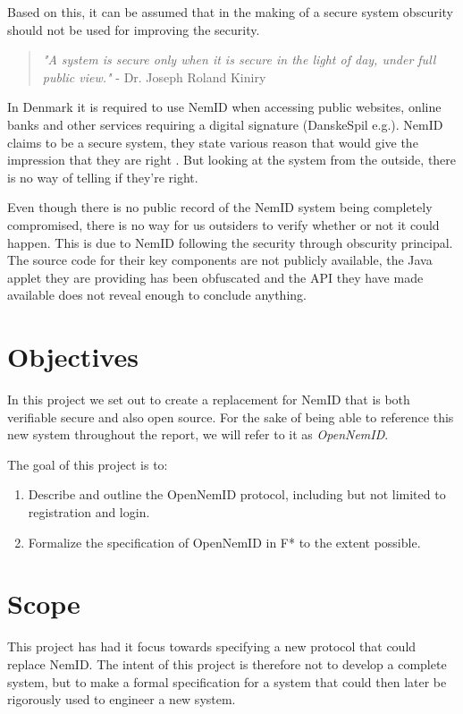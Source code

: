 \documentclass[twosided]{report}
\begin{document}
Based on this, it can be assumed that in the making of a secure system obscurity should not be used for improving the security.
\begin{quote}
\textit{"A system is secure only when it is secure in the light of day, under full public view."} - Dr. Joseph Roland Kiniry \cite{ftspeech}
\end{quote}
\par
In Denmark it is required to use NemID when accessing public websites, online banks and other services requiring a digital signature (DanskeSpil e.g.). NemID claims to be a secure system, they state various reason that would give the impression that they are right \cite{omnemsikkerhed}. But looking at the system from the outside, there is no way of telling if they're right.
\par
Even though there is no public record of the NemID system being completely compromised, there is no way for us outsiders to verify whether or not it could happen. This is due to NemID following the security through obscurity principal. The source code for their key components are not publicly available, the Java applet they are providing has been obfuscated and the API they have made available does not reveal enough to conclude anything.

\section{Objectives}
In this project we set out to create a replacement for NemID that is both verifiable secure and also open source. For the sake of being able to reference this new system throughout the report, we will refer to it as \emph{OpenNemID}.
\par
The goal of this project is to:
\begin{enumerate}
	\item Describe and outline the OpenNemID protocol, including but not limited to registration and login.
	\item Formalize the specification of OpenNemID in F* to the extent possible.
\end{enumerate}

\section{Scope}
This project has had it focus towards specifying a new protocol that could replace NemID. The intent of this project is therefore not to develop a complete system, but to make a formal specification for a system that could then later be rigorously used to engineer a new system.
\end{document}
